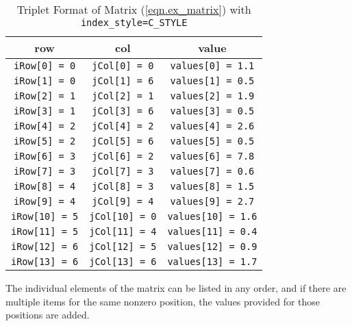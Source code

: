 \documentclass[letter,10pt]{article}
\begin{document}
\begin{footnotesize}
\begin{table}[h]
\begin{center}
\end{center}
\end{table}
\begin{table}[h]%
\begin{center}
\caption{Triplet Format of Matrix (\ref{eqn.ex_matrix}) 
with {\tt index\_style=C\_STYLE}}
\label{tab.c_triplet}
\begin{tabular}{c c c}
row     		&       col     	&       value 			    \\
\hline
{\tt iRow[0] = 0}       &       {\tt jCol[0] = 0}       & {\tt values[0] = 1.1}     \\
{\tt iRow[1] = 0}       &       {\tt jCol[1] = 6}       & {\tt values[1] = 0.5}     \\
{\tt iRow[2] = 1}       &       {\tt jCol[2] = 1}       & {\tt values[2] = 1.9}     \\
{\tt iRow[3] = 1}       &       {\tt jCol[3] = 6}       & {\tt values[3] = 0.5}     \\
{\tt iRow[4] = 2}       &       {\tt jCol[4] = 2}       & {\tt values[4] = 2.6}     \\
{\tt iRow[5] = 2}       &       {\tt jCol[5] = 6}       & {\tt values[5] = 0.5}     \\
{\tt iRow[6] = 3}       &       {\tt jCol[6] = 2}       & {\tt values[6] = 7.8}     \\
{\tt iRow[7] = 3}       &       {\tt jCol[7] = 3}       & {\tt values[7] = 0.6}     \\
{\tt iRow[8] = 4}       &       {\tt jCol[8] = 3}       & {\tt values[8] = 1.5}     \\
{\tt iRow[9] = 4}       &       {\tt jCol[9] = 4}       & {\tt values[9] = 2.7}     \\
{\tt iRow[10] = 5}      &       {\tt jCol[10] = 0}      & {\tt values[10] = 1.6}     \\
{\tt iRow[11] = 5}      &       {\tt jCol[11] = 4}      & {\tt values[11] = 0.4}     \\
{\tt iRow[12] = 6}      &       {\tt jCol[12] = 5}      & {\tt values[12] = 0.9}     \\
{\tt iRow[13] = 6}      &       {\tt jCol[13] = 6}      & {\tt values[13] = 1.7}
\end{tabular}
\end{center}
\end{table}
\end{footnotesize}
The individual elements of the matrix can be listed in any order, and
if there are multiple items for the same nonzero position, the values
provided for those positions are added.
\end{document}

